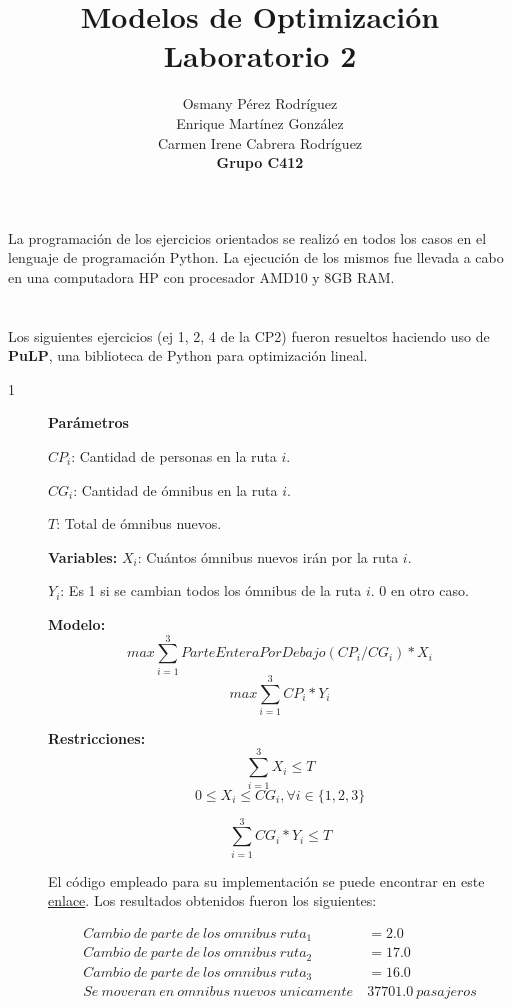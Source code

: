 \documentclass[titlepage, 11pt]{scrartcl}
\title{
    \normalfont\normalsize
    {\huge Modelos de Optimización\\
    		\textbf{Laboratorio 2}}
    \vspace{12pt}
}
\author{Osmany P\'erez Rodr\'iguez\\
		Enrique Mart\'inez Gonz\'alez\\
		Carmen Irene Cabrera Rodr\'iguez\\
		\textbf{Grupo C412}}
\date{}
\begin{document}
    \maketitle 
    
	La programaci\'on de los ejercicios orientados se realiz\'o en todos los casos en el lenguaje de programaci\'on Python. La ejecuci\'on de los mismos fue llevada a cabo en una computadora HP con procesador AMD10 y 8GB RAM.
    \section{}{
		Los siguientes ejercicios (ej 1, 2, 4 de la CP2) fueron resueltos haciendo uso de \textbf{\textbf{PuLP}}, una biblioteca de Python para optimizaci\'on lineal.
    	\begin{description}
    		\item[1] 
    		
    		\textbf{Parámetros}
    			
   				$CP_i$: Cantidad de personas en la ruta $i$.
   				
   				$CG_i$: Cantidad de \'omnibus en la ruta $i$.
   				
   				$T$: Total de ómnibus nuevos.
    		
    		
    		\textbf{Variables:}
   				$X_i$: Cuántos ómnibus nuevos irán por la ruta $i$.
   				
   				$Y_i$: Es 1 si se cambian todos los ómnibus de la ruta $i$. 0 en otro caso.
    		
    		\textbf{Modelo:}
    			$$max \sum_{i = 1}^{3}ParteEnteraPorDebajo(CP_i/CG_i) * X_i$$
    			$$max \sum_{i = 1}^{3}CP_i * Y_i$$
    	
    		
    		\textbf{Restricciones:}
    			$$\sum_{i=1}^{3}X_i \leq T$$
    			$$0 \leq X_i \leq CG_i, \forall i \in \{1, 2, 3\}$$
    			
    			$$\sum_{i = 1}^{3}CG_i * Y_i \leq T$$
    		
    	
    		El c\'odigo empleado para su implementaci\'on se puede encontrar en este \href{lab2ex1.py}{enlace}. Los resultados obtenidos fueron los siguientes:
    		
    		
    		\begin{align*}
    			Cambio \ de \ parte \ de \ los \ omnibus \ ruta_1 &= 2.0\\
    			Cambio \ de \ parte \ de \ los \ omnibus \ ruta_2 &= 17.0\\
    			Cambio \ de \ parte \ de \ los \ omnibus \ ruta_3 &= 16.0\\
    			Se \ moveran \ en \ omnibus \ nuevos \ unicamente \ &37701.0 \ pasajeros
    		\end{align*}


\end{description}}
\end{document}
